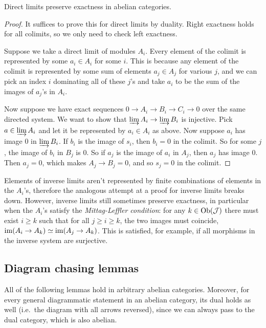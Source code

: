 \begin{prop}\label{prop direct limits preserve exactness}
    Direct limits preserve exactness in abelian categories.
\end{prop}
\begin{proof}
    It suffices to prove this for direct limits by duality. Right exactness holds for all colimits, so we only need to check left exactness.
    
    Suppose we take a direct limit of modules $A_i$. Every element of the colimit is represented by some $a_i\in A_i$ for some $i$. This is because any element of the colimit is represented by some sum of elements $a_j\in A_j$ for various $j$, and we can pick an index $i$ dominating all of these $j$'s and take $a_i$ to be the sum of the images of $a_j$'s in $A_i$.

    Now suppose we have exact sequences $0\to A_i\to B_i\to C_i\to 0$ over the same directed system. We want to show that $\varinjlim A_i\to \varinjlim B_i$ is injective. Pick $a\in\varinjlim A_i$ and let it be represented by $a_i\in A_i$ as above. Now suppose $a_i$ has image $0$ in $\varinjlim B_i$. If $b_i$ is the image of $s_i$, then $b_i=0$ in the colimit. So for some $j$, the image of $b_i$ in $B_j$ is $0$. So if $a_j$ is the image of $a_i$ in $A_j$, then $a_j$ has image $0$. Then $a_j=0$, which makes $A_j\to B_j=0$, and so $s_j=0$ in the colimit.
\end{proof}
\begin{rem}
    Elements of inverse limits aren't represented by finite combinations of elements in the $A_i$'s, therefore the analogous attempt at a proof for inverse limits breaks down. However, inverse limits still sometimes preserve exactness, in particular when the $A_i$'s satisfy the \emph{Mittag-Leffler condition}: for any $k\in \operatorname{Ob}(\mathcal{J})$ there must exist $i\geq k$ such that for all $j\geq i\geq k$, the two images must coincide, $\operatorname{im}(A_i\to A_k)\simeq \operatorname{im}(A_j\to A_k)$. This is satisfied, for example, if all morphisms in the inverse system are surjective.
\end{rem}




\subsection{Diagram chasing lemmas}

All of the following lemmas hold in arbitrary abelian categories. Moreover, for every general diagrammatic statement in an abelian category, its dual holds as well (i.e.\ the diagram with all arrows reversed), since we can always pass to the dual category, which is also abelian.

